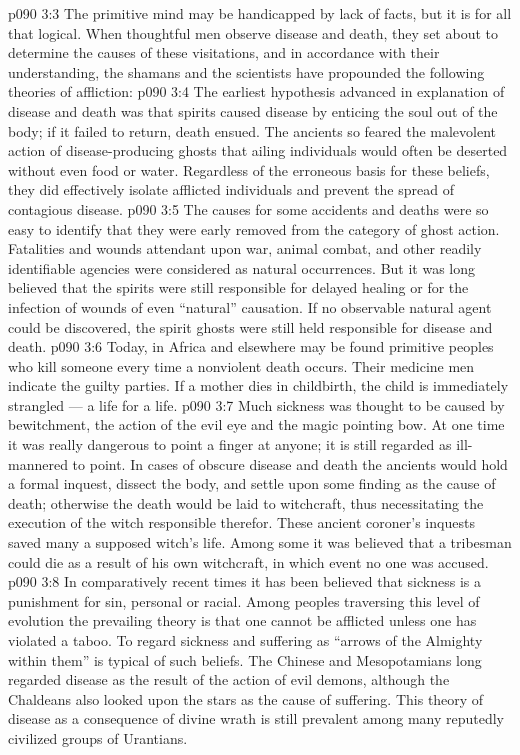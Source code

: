 \vs p090 3:3 The primitive mind may be handicapped by lack of facts, but it is for all that logical. When thoughtful men observe disease and death, they set about to determine the causes of these visitations, and in accordance with their understanding, the shamans and the scientists have propounded the following theories of affliction:
\vs p090 3:4 \bibnobreakspace {} The earliest hypothesis advanced in explanation of disease and death was that spirits caused disease by enticing the soul out of the body; if it failed to return, death ensued. The ancients so feared the malevolent action of disease\hyp{}producing ghosts that ailing individuals would often be deserted without even food or water. Regardless of the erroneous basis for these beliefs, they did effectively isolate afflicted individuals and prevent the spread of contagious disease.
\vs p090 3:5 \bibnobreakspace {} The causes for some accidents and deaths were so easy to identify that they were early removed from the category of ghost action. Fatalities and wounds attendant upon war, animal combat, and other readily identifiable agencies were considered as natural occurrences. But it was long believed that the spirits were still responsible for delayed healing or for the infection of wounds of even “natural” causation. If no observable natural agent could be discovered, the spirit ghosts were still held responsible for disease and death.
\vs p090 3:6 Today, in Africa and elsewhere may be found primitive peoples who kill someone every time a nonviolent death occurs. Their medicine men indicate the guilty parties. If a mother dies in childbirth, the child is immediately strangled --- a life for a life.
\vs p090 3:7 \bibnobreakspace {} Much sickness was thought to be caused by bewitchment, the action of the evil eye and the magic pointing bow. At one time it was really dangerous to point a finger at anyone; it is still regarded as ill\hyp{}mannered to point. In cases of obscure disease and death the ancients would hold a formal inquest, dissect the body, and settle upon some finding as the cause of death; otherwise the death would be laid to witchcraft, thus necessitating the execution of the witch responsible therefor. These ancient coroner’s inquests saved many a supposed witch’s life. Among some it was believed that a tribesman could die as a result of his own witchcraft, in which event no one was accused.
\vs p090 3:8 \bibnobreakspace {} In comparatively recent times it has been believed that sickness is a punishment for sin, personal or racial. Among peoples traversing this level of evolution the prevailing theory is that one cannot be afflicted unless one has violated a taboo. To regard sickness and suffering as “arrows of the Almighty within them” is typical of such beliefs. The Chinese and Mesopotamians long regarded disease as the result of the action of evil demons, although the Chaldeans also looked upon the stars as the cause of suffering. This theory of disease as a consequence of divine wrath is still prevalent among many reputedly civilized groups of Urantians.
